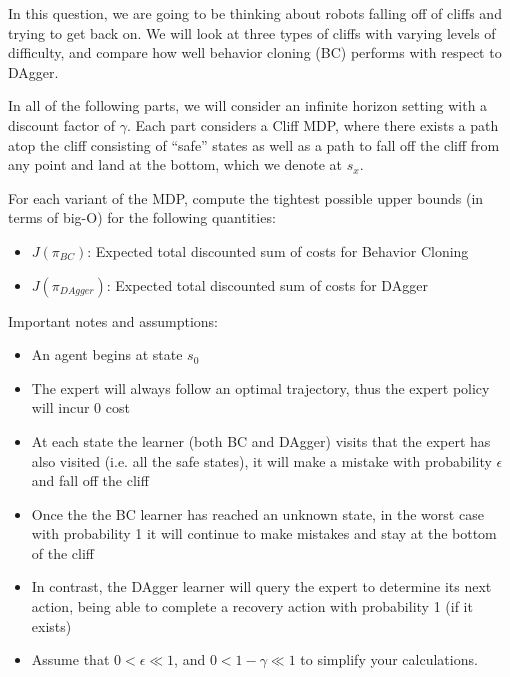 \documentclass[11pt]{article}
\begin{document}
\newpage

\vskip 0.1in

\noindent In this question, we are going to be thinking about robots falling off of cliffs and trying to get back on. We will look at three types of cliffs with varying levels of difficulty, and compare how well behavior cloning (BC) performs with respect to DAgger. 

\noindent In all of the following parts, we will consider an infinite horizon setting with a discount factor of $\gamma$. Each part considers a Cliff MDP, where there exists a path atop the cliff consisting of ``safe'' states as well as a path to fall off the cliff from any point and land at the bottom, which we denote at $s_x$. 

For each variant of the MDP, compute the tightest possible upper bounds (in terms of big-O) for the following quantities:
\begin{itemize}
    \item $J(\pi_{BC})$: Expected total discounted sum of costs for Behavior Cloning
    \item $J(\pi_{DAgger})$: Expected total discounted sum of costs for DAgger
\end{itemize}
Important notes and assumptions:
\begin{itemize}
    \item An agent begins at state $s_0$
    \item The expert will always follow an optimal trajectory, thus the expert policy will incur 0 cost
    \item At each state the learner (both BC and DAgger) visits that the expert has also visited (i.e. all the safe states), it will make a mistake with probability $\epsilon$ and fall off the cliff
    \item Once the the BC learner has reached an unknown state, in the worst case with probability 1 it will continue to make mistakes and stay at the bottom of the cliff
    \item In contrast, the DAgger learner will query the expert to determine its next action, being able to complete a recovery action with probability 1 (if it exists)
    \item Assume that $0 < \epsilon \ll 1$, and $0 < 1 - \gamma \ll 1$ to simplify your calculations.
\end{itemize}
\end{document}
